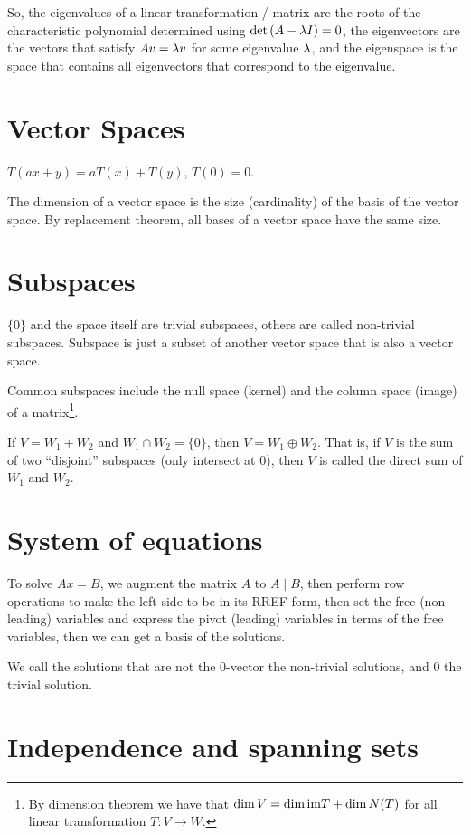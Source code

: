 \documentclass[11pt, cyan, night, 1in]{LatexTemplate/hw}
\begin{document}
So, the eigenvalues of a linear transformation / matrix are the roots of the characteristic polynomial determined using $\det\left(A - \lambda I\right)=0$, the eigenvectors are the vectors that satisfy $Av=\lambda v$ for some eigenvalue $\lambda$, and the eigenspace is the space that contains all eigenvectors that correspond to the  eigenvalue.

\section{Vector Spaces}

$T(ax+y)=aT(x)+T(y)$, $T(0)=0$.

The dimension of a vector space is the size (cardinality) of the basis of the vector space. By replacement theorem, all bases of a vector space have the same size.

\section{Subspaces}

$\{0\}$ and the space itself are trivial subspaces, others are called non-trivial subspaces. Subspace is just a subset of another vector space that is also a vector space.

Common subspaces include the null space (kernel) and the column space (image) of a matrix\footnote{By dimension theorem we have that $\dim V = \dim \text{im} T + \dim N(T)$ for all linear transformation $T: V\to W$.}.

If $V=W_1+W_2$ and $W_1\cap W_2=\{0\}$, then $V=W_1\oplus W_2$. That is, if $V$ is the sum of two ``disjoint'' subspaces (only intersect at $0$), then $V$ is called the direct sum of $W_1$ and $W_2$.

\section{System of equations}

To solve $Ax=B$, we augment the matrix $A$ to $A\mid B$, then perform row operations to make the left side to be in its RREF form, then set the free (non-leading) variables and express the pivot (leading) variables in terms of the free variables, then we can get a basis of the solutions. 

We call the solutions that are not the 0-vector the non-trivial solutions, and 0 the trivial solution.

\section{Independence and spanning sets}
\end{document}

